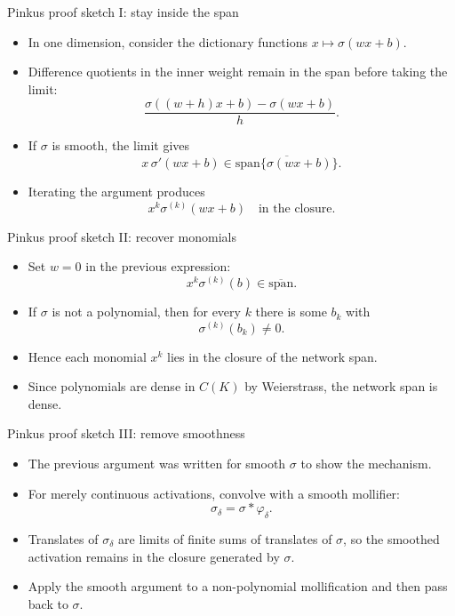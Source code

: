 \documentclass[aspectratio=43,11pt]{beamer}
\newcommand{\slideid}{L2}
\newenvironment{slideitems}{\small\begin{itemize}\setlength\itemsep{0.45em}}{\end{itemize}}
\begin{document}
\renewcommand{\slideid}{L2-S28}
\begin{frame}[t]{Pinkus proof sketch I: stay inside the span}
\begin{slideitems}
\item In one dimension, consider the dictionary functions $x\mapsto\sigma(wx+b)$.
\item Difference quotients in the inner weight remain in the span before taking the limit:
\[
 \frac{\sigma((w+h)x+b)-\sigma(wx+b)}{h}.
\]
\item If $\sigma$ is smooth, the limit gives
\[
 x\,\sigma'(wx+b)\in\overline{\mathrm{span}\{\sigma(wx+b)\}}.
\]
\item Iterating the argument produces
\[
 x^k\sigma^{(k)}(wx+b)\quad\text{in the closure.}
\]
\end{slideitems}
\end{frame}

\renewcommand{\slideid}{L2-S29}
\begin{frame}[t]{Pinkus proof sketch II: recover monomials}
\begin{slideitems}
\item Set $w=0$ in the previous expression:
\[
 x^k\sigma^{(k)}(b)\in \overline{\mathrm{span}}.
\]
\item If $\sigma$ is not a polynomial, then for every $k$ there is some $b_k$ with
\[
 \sigma^{(k)}(b_k)\ne 0.
\]
\item Hence each monomial $x^k$ lies in the closure of the network span.
\item Since polynomials are dense in $C(K)$ by Weierstrass, the network span is dense.
\end{slideitems}
\end{frame}

\renewcommand{\slideid}{L2-S30}
\begin{frame}[t]{Pinkus proof sketch III: remove smoothness}
\begin{slideitems}
\item The previous argument was written for smooth $\sigma$ to show the mechanism.
\item For merely continuous activations, convolve with a smooth mollifier:
\[
 \sigma_\delta=\sigma*\varphi_\delta.
\]
\item Translates of $\sigma_\delta$ are limits of finite sums of translates of $\sigma$, so the smoothed activation remains in the closure generated by $\sigma$.
\item Apply the smooth argument to a non-polynomial mollification and then pass back to $\sigma$.
\end{slideitems}
\end{frame}
\end{document}
